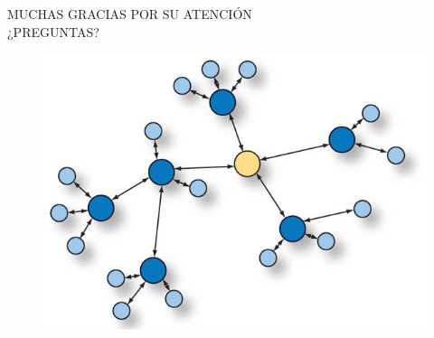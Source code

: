 \documentclass[aspectratio=169]{beamer}
\begin{document}
%
%
%
%


\begingroup
\makeatletter
\setlength{\hoffset}{-.5\beamer@sidebarwidth}
\makeatother
\begin{frame}
\fontsize{18pt}{15}\selectfont
\begin{center}
	MUCHAS GRACIAS POR SU ATENCIÓN\\
	\vspace{2cm}
	¿PREGUNTAS?
	\begin{minipage}[c]{0.35\linewidth}
		\begin{figure}[H]
			\includegraphics[width=1\textwidth]{./imagenes/red.jpg}
		\end{figure}	  	  	
	\end{minipage}
\end{center}
\end{frame}
\endgroup
\end{document}
